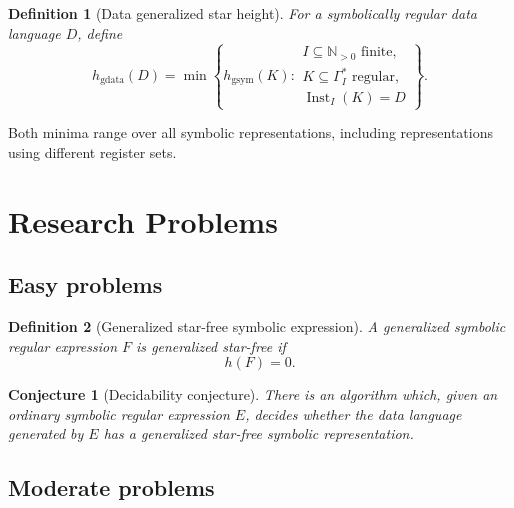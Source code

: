 \documentclass[11pt]{article}
\newtheorem{definition}{Definition}
\newtheorem{conjecture}{Conjecture}
\begin{document}
\begin{definition}[Data generalized star height]
For a symbolically regular data language $D$, define
\[
 h_{\mathrm{gdata}}(D)=
 \min\left\{
 h_{\mathrm{gsym}}(K):
 \begin{array}{l}
 I\subseteq\mathbb N_{>0}\text{ finite},\\
 K\subseteq\Gamma_I^*\text{ regular},\\
 \operatorname{Inst}_I(K)=D
 \end{array}
 \right\}.
\]
\end{definition}

Both minima range over all symbolic representations, including
representations using different register sets.

\section{Research Problems }

\subsection{Easy problems}






\begin{definition}[Generalized star-free symbolic expression]
A generalized symbolic regular expression $F$ is
\emph{generalized star-free} if
\[
  h(F)=0.
\]
\end{definition}


\begin{conjecture}[Decidability conjecture]
There is an algorithm which, given an ordinary symbolic regular expression
$E$, decides whether the data language generated by $E$ has a generalized
star-free symbolic representation.
\end{conjecture}




\subsection{Moderate problems}
\end{document}
